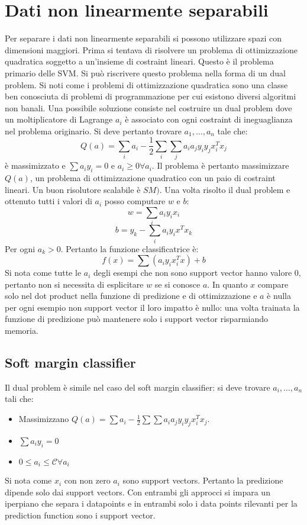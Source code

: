 \section{Dati non linearmente separabili}
Per separare i dati non linearmente separabili si possono utilizzare spazi con dimensioni maggiori.
Prima si tentava di risolvere un problema di ottimizzazione quadratica soggetto a un'insieme di costraint lineari.
Questo \`e il problema primario delle SVM.
Si pu\`o riscrivere questo problema nella forma di un dual problem.
Si noti come i problemi di ottimizzazione quadratica sono una classe ben conosciuta di problemi di programmazione per cui esistono diversi algoritmi non banali.
Una possibile soluzione consiste nel costruire un dual problem dove un moltiplicatore di Lagrange $a_i$ \`e associato con ogni costraint di ineguaglianza nel problema originario.
Si deve pertanto trovare $a_1,\dots,a_n$ tale che:
$$Q(a) = \sum_i a_i - \frac{1}{2}\sum_i\sum_j a_ia_jy_iy_jx_i^Tx_j$$
\`e massimizzato e $\sum a_iy_i = 0$ e $a_i\ge 0\forall a_i$.
Il problema \`e pertanto massimizzare $Q(a)$, un problema di ottimizzazione quadratico con un paio di costraint lineari.
Un buon risolutore scalabile \`e $SM)$.
Una volta risolto il dual problem e ottenuto tutti i valori di $a_i$ posso computare $w$ e $b$:
$$w=\sum_i a_iy_ix_i$$
$$b = y_k - \sum_i a_iy_ix^Tx_k$$
Per ogni $a_k>0$.
Pertanto la funzione classificatrice \`e:
$$f(x) = \sum(a_iy_ix_i^Tx)+b$$
Si nota come tutte le $a_i$ degli esempi che non sono support vector hanno valore $0$, pertanto non si necessita di esplicitare $w$ se si conosce $a$.
In quanto $x$ compare solo nel dot product nella funzione di predizione e di ottimizzazione e $a$ \`e nulla per ogni esempio non support vector il loro impatto \`e nullo: una volta trainata la funzione di predizione pu\`o mantenere solo i support vector risparmiando memoria.

	\subsection{Soft margin classifier}
	Il dual problem \`e simile nel caso del soft margin classifier: si deve trovare $a_i,\dots, a_n$ tali che:
	\begin{itemize}
		\item Massimizzano $Q(a) = \sum a_i-\frac{1}{2}\sum\sum a_ia_jy_iy_jx_i^Tx_j$.
		\item $\sum a_iy_i = 0$
		\item $0\le a_i\le \mathcal{C}\forall a_i$
	\end{itemize}
	Si nota come $x_i$ con non zero $a_i$ sono support vectors.
	Pertanto la predizione dipende solo dai support vectors.
	Con entrambi gli approcci si impara un iperpiano che separa i datapoints e in entrambi solo i data points rilevanti per la prediction function sono i support vector.
	
